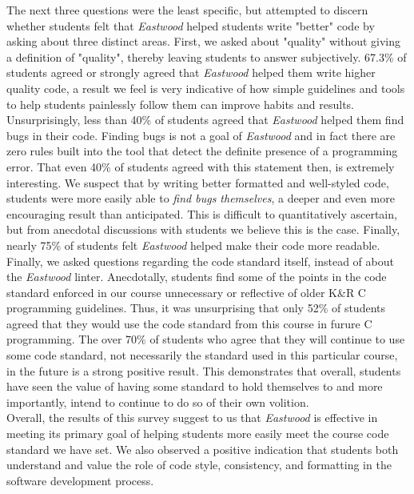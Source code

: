 \documentclass[sigconf]{acmart}
\begin{document}
The next three questions were the least specific, but attempted to discern whether
students felt that \textit{Eastwood} helped students write "better" code by asking about
three distinct areas. First, we asked about "quality" without giving a definition of
"quality", thereby leaving students to answer subjectively. 67.3\% of students agreed
or strongly agreed that \textit{Eastwood} helped them write higher quality code, a result
we feel is very indicative of how simple guidelines and tools to help students painlessly
follow them can improve habits and results. Unsurprisingly, less than 40\% of students
agreed that \textit{Eastwood} helped them find bugs in their code. Finding bugs is not a
goal of \textit{Eastwood} and in fact there are zero rules built into the tool
that detect the definite presence of a programming error. That even 40\% of students
agreed with this statement then, is extremely interesting. We suspect that by writing
better formatted and well-styled code, students were more easily able to \textit{find
  bugs themselves}, a deeper and even more encouraging result than anticipated. This is
difficult to quantitatively ascertain, but from anecdotal discussions with students
we believe this is the case. Finally, nearly 75\% of students felt \textit{Eastwood}
helped make their code more readable.
\\

Finally, we asked questions regarding the code standard itself, instead of about the
\textit{Eastwood} linter. Anecdotally, students find some of the points in the code
standard enforced in our course unnecessary or reflective of older K\&R C programming
guidelines. Thus, it was unsurprising that only 52\% of students agreed that they would
use the code standard from this course in furure C programming. The over 70\%
of students who agree that they will continue to use some code standard, not necessarily
the standard used in this particular course, in the future is a strong positive result.
This demonstrates that overall, students have seen the value of having some standard to
hold themselves to and more importantly, intend to continue to do so of their own
volition.
\\



Overall, the results of this survey suggest to us that \textit{Eastwood} is effective in
meeting its primary goal of helping students more easily meet the course code standard
we have set. We also observed a positive indication that students both understand and
value the role of code style, consistency, and formatting in the software development
process.
\\
\end{document}
